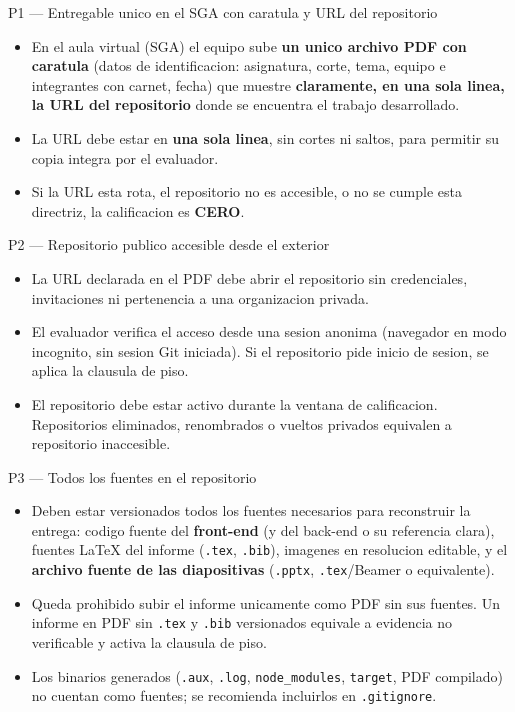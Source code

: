 \documentclass[11pt,a4paper]{article}
\begin{document}
\begin{cajacritica}{P1 --- Entregable unico en el SGA con caratula y URL del repositorio}
	\begin{itemize}
		\item En el aula virtual (SGA) el equipo sube \textbf{un unico archivo PDF con caratula} (datos de identificacion: asignatura, corte, tema, equipo e integrantes con carnet, fecha) que muestre \textbf{claramente, en una sola linea, la URL del repositorio} donde se encuentra el trabajo desarrollado.
		\item La URL debe estar en \textbf{una sola linea}, sin cortes ni saltos, para permitir su copia integra por el evaluador.
		\item Si la URL esta rota, el repositorio no es accesible, o no se cumple esta directriz, la calificacion es \textbf{CERO}.
	\end{itemize}
\end{cajacritica}

\begin{cajacritica}{P2 --- Repositorio publico accesible desde el exterior}
	\begin{itemize}
		\item La URL declarada en el PDF debe abrir el repositorio sin credenciales, invitaciones ni pertenencia a una organizacion privada.
		\item El evaluador verifica el acceso desde una sesion anonima (navegador en modo incognito, sin sesion Git iniciada). Si el repositorio pide inicio de sesion, se aplica la clausula de piso.
		\item El repositorio debe estar activo durante la ventana de calificacion. Repositorios eliminados, renombrados o vueltos privados equivalen a repositorio inaccesible.
	\end{itemize}
\end{cajacritica}

\begin{cajacritica}{P3 --- Todos los fuentes en el repositorio}
	\begin{itemize}
		\item Deben estar versionados todos los fuentes necesarios para reconstruir la entrega: codigo fuente del \textbf{front-end} (y del back-end o su referencia clara), fuentes LaTeX del informe (\texttt{.tex}, \texttt{.bib}), imagenes en resolucion editable, y el \textbf{archivo fuente de las diapositivas} (\texttt{.pptx}, \texttt{.tex}/Beamer o equivalente).
		\item Queda prohibido subir el informe unicamente como PDF sin sus fuentes. Un informe en PDF sin \texttt{.tex} y \texttt{.bib} versionados equivale a evidencia no verificable y activa la clausula de piso.
		\item Los binarios generados (\texttt{.aux}, \texttt{.log}, \texttt{node\_modules}, \texttt{target}, PDF compilado) no cuentan como fuentes; se recomienda incluirlos en \texttt{.gitignore}.
	\end{itemize}
\end{cajacritica}
\end{document}

